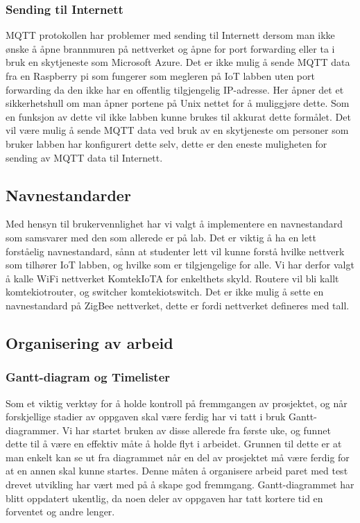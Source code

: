 \documentclass{article}
\begin{document}
\subsubsection{Sending til Internett}
MQTT protokollen har problemer med sending til Internett dersom man ikke ønske å åpne brannmuren på nettverket og åpne for port forwarding eller ta i bruk en skytjeneste som Microsoft Azure. Det er ikke mulig å sende MQTT data fra en Raspberry pi som fungerer som megleren på IoT labben uten port forwarding da den ikke har en offentlig tilgjengelig IP-adresse. Her åpner det et sikkerhetshull om man åpner portene på Unix nettet for å muliggjøre dette. Som en funksjon av dette vil ikke labben kunne brukes til akkurat dette formålet. Det vil være mulig å sende MQTT data ved bruk av en skytjeneste om personer som bruker labben har konfigurert dette selv, dette er den eneste muligheten for sending av MQTT data til Internett.


\subsection{Navnestandarder}
Med hensyn til brukervennlighet har vi valgt å implementere en navnestandard som samsvarer med den som allerede er på lab. Det er viktig å ha en lett forståelig navnestandard, sånn at studenter lett vil kunne forstå hvilke nettverk som tilhører IoT labben, og hvilke som er tilgjengelige for alle. Vi har derfor valgt å kalle WiFi nettverket Komtek\textunderscore IoT\textunderscore A for enkelthets skyld. Routere vil bli kallt komtekiotrouter, og switcher komtekiotswitch. Det er ikke mulig å sette en navnestandard på ZigBee nettverket, dette er fordi nettverket defineres med tall.
\newpage
\subsection{Organisering av arbeid}
\subsubsection{Gantt-diagram og Timelister}
Som et viktig verktøy for å holde kontroll på fremmgangen av prosjektet, og når forskjellige stadier av oppgaven skal være ferdig har vi tatt i bruk Gantt-diagrammer. Vi har startet bruken av disse allerede fra første uke, og funnet dette til å være en effektiv måte å holde flyt i arbeidet. Grunnen til dette er at man enkelt kan se ut fra diagrammet når en del av prosjektet må være ferdig for at en annen skal kunne startes. Denne måten å organisere arbeid paret med test drevet utvikling har vært med på å skape god fremmgang. Gantt-diagrammet har blitt oppdatert ukentlig, da noen deler av oppgaven har tatt kortere tid en forventet og andre lenger. 
\end{document}
